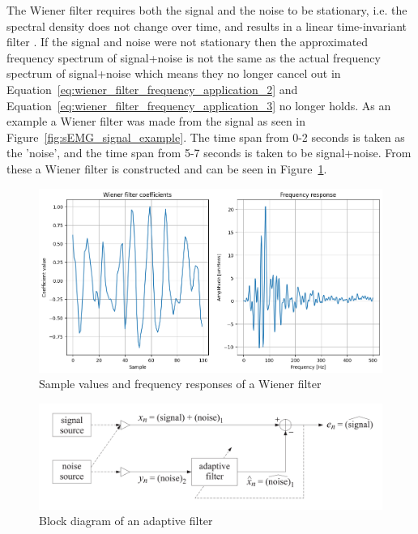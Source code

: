 The Wiener filter requires both the signal and the noise to be stationary, i.e. the spectral density does not change over time, and results in a linear time-invariant filter \cite{stationary_processes_definition} \cite{difference_stationary_nonstationary}. If the signal and noise were not stationary then the approximated frequency spectrum of signal+noise is not the same as the actual frequency spectrum of signal+noise which means they no longer cancel out in Equation~\ref{eq:wiener_filter_frequency_application_2} and Equation~\ref{eq:wiener_filter_frequency_application_3} no longer holds.
As an example a Wiener filter was made from the signal as seen in Figure~\ref{fig:sEMG_signal_example}. The time span from 0-2 seconds is taken as the 'noise', and the time span from 5-7 seconds is taken to be signal+noise. From these a Wiener filter is constructed and can be seen in Figure~\ref{fig:wiener_filter_response}.

\begin{figure}[h!t]
	\begin{center}
		\includegraphics[width=1.0\columnwidth]{images/wiener_filter_response.png}
	\end{center}
	\caption{Sample values and frequency responses of a Wiener filter}
	\label{fig:wiener_filter_response}
\end{figure}

\begin{figure}[h!t]
	\begin{center}
		\includegraphics[width=0.7\columnwidth]{images/adaptive_filter_block_diagram.png}
	\end{center}
	\caption{Block diagram of an adaptive filter \cite{introduction_optimal_signal_processing}}
	\label{fig:adaptive_filter_diagram}
\end{figure}

